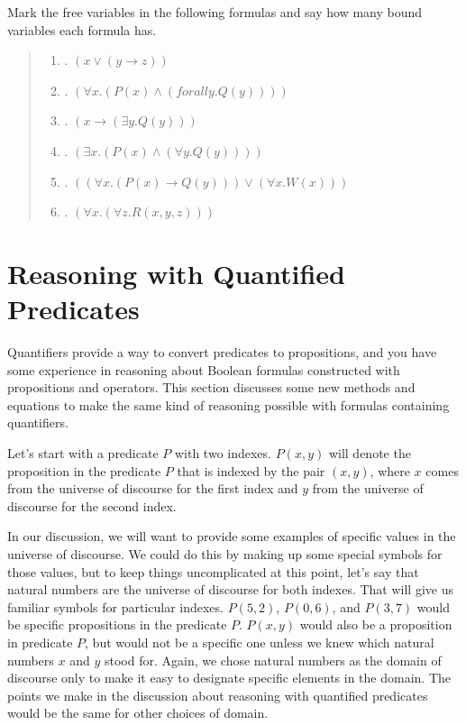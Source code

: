 {\begin{ExerciseList}
\Exercise
Mark the free variables in the following formulas and say how many bound variables
each formula has.
\begin{quote}
\begin{enumerate}[label=\alph*]
\item. $(x \vee (y \rightarrow z))$
\item. $(\forall x.(P(x) \wedge (forall y.Q(y))))$
\item. $(x \rightarrow (\exists y.Q(y)))$
\item. $(\exists x.(P(x) \wedge (\forall y.Q(y))))$
\item. $((\forall x.(P(x) \rightarrow Q(y))) \vee (\forall x.W(x)))$
\item. $(\forall x. (\forall z.R(x, y, z)))$
\end{enumerate}
\end{quote}

\end{ExerciseList}

\section{Reasoning with Quantified Predicates}
\label{sec:quantifier-equations}

Quantifiers provide a way to convert predicates to propositions,
and you have some experience in reasoning about Boolean formulas constructed with
propositions and operators.
This section discusses some new methods and equations to make
the same kind of reasoning possible with formulas containing quantifiers.

Let's start with a predicate $P$ with two indexes.
$P(x,y)$ will denote the proposition in the predicate $P$ that is indexed
by the pair $(x,y)$, where $x$ comes from the universe of discourse for the first index
and $y$ from the universe of discourse for the second index.

In our discussion, we will want to provide some examples
of specific values in the universe of discourse.
We could do this by making up some special symbols for those values,
but to keep things uncomplicated at this point,
let's say that natural numbers are the universe of discourse for both indexes.
That will give us familiar symbols for particular indexes.
$P(5,2)$, $P(0,6)$, and $P(3,7)$ would be specific propositions in the predicate $P$.
$P(x,y)$ would also be a proposition in predicate $P$, but would not be a specific one
unless we knew which natural numbers $x$ and $y$ stood for.
Again, we chose natural numbers as the domain of discourse
only to make it easy to designate specific elements in the domain.
The points we make in the discussion about reasoning with quantified predicates
would be the same for other choices of domain.

}
